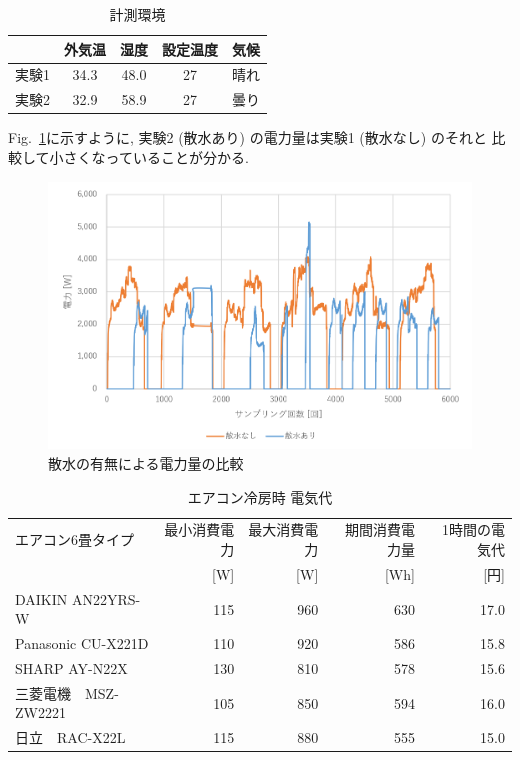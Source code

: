 \documentclass[a4j,fleqn,dvipdfmx,uplatex]{jsarticle}
\newcommand{\figref}[1]{Fig.\ \ref{#1}}
\begin{document}
\begin{table}[tbh]
  \caption{計測環境}
  \label{table:ex1}
  \centering
  \begin{tabular}{lcccc}
     & 外気温 & 湿度 & 設定温度 & 気候 \\
    \hline \hline
    実験1 & 34.3 & 48.0 & 27 & 晴れ  \\
    実験2 & 32.9 & 58.9 & 27 & 曇り \\
    \hline
  \end{tabular}
\end{table}

\figref{fig1:compare_watering}に示すように, 実験2 (散水あり) の電力量は実験1 (散水なし) のそれと
比較して小さくなっていることが分かる.

\begin{figure}[tb]
  \centering
      \includegraphics[width=0.9\linewidth]{img/ex1.png}
      \caption{散水の有無による電力量の比較}
      \label{fig1:compare_watering}
\end{figure}


\begin{table}[tbh]
  \caption{エアコン冷房時 電気代}
  \label{table:aircon}
  \centering
  \begin{tabular}{lrrrr}
    エアコン6畳タイプ & 最小消費電力 & 最大消費電力 & 期間消費電力量 & 1時間の電気代 \\
     & [W] & [W] & [Wh] & [円] \\
    \hline \hline
    DAIKIN AN22YRS-W & 115 & 960 & 630 & 17.0 \\
    Panasonic CU-X221D & 110 & 920 & 586 & 15.8 \\
    SHARP AY-N22X & 130 & 810 & 578 & 15.6 \\
    三菱電機　MSZ-ZW2221 & 105 & 850 & 594 & 16.0 \\
    日立　RAC-X22L & 115 & 880 & 555 & 15.0 \\
    \hline
  \end{tabular}
\end{table}
\end{document}
